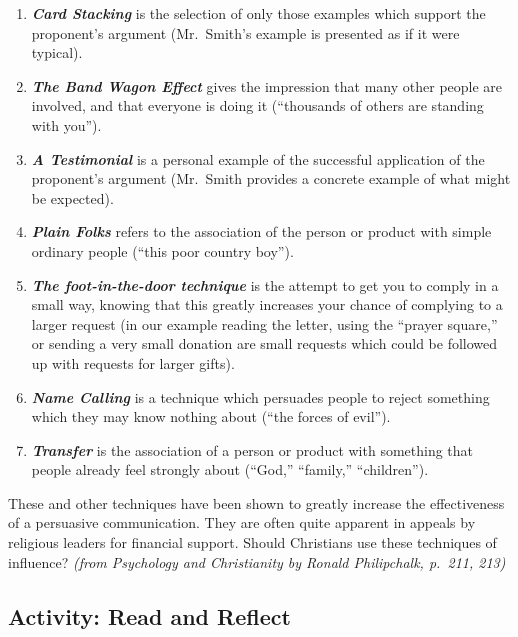 \documentclass[
]{book}
\providecommand{\tightlist}{%
  \setlength{\itemsep}{0pt}\setlength{\parskip}{0pt}}
\begin{document}
\begin{enumerate}
\def\labelenumi{\arabic{enumi}.}
\tightlist
\item
  \textbf{\emph{Card Stacking}} is the selection of only those examples which support the proponent's argument (Mr.~Smith's example is presented as if it were typical).\\
\item
  \textbf{\emph{The Band Wagon Effect}} gives the impression that many other people are involved, and that everyone is doing it (``thousands of others are standing with you'').\\
\item
  \textbf{\emph{A Testimonial}} is a personal example of the successful application of the proponent's argument (Mr.~Smith provides a concrete example of what might be expected).\\
\item
  \textbf{\emph{Plain Folks}} refers to the association of the person or product with simple ordinary people (``this poor country boy'').\\
\item
  \textbf{\emph{The foot-in-the-door technique}} is the attempt to get you to comply in a small way, knowing that this greatly increases your chance of complying to a larger request (in our example reading the letter, using the ``prayer square,'' or sending a very small donation are small requests which could be followed up with requests for larger gifts).\\
\item
  \textbf{\emph{Name Calling}} is a technique which persuades people to reject something which they may know nothing about (``the forces of evil'').\\
\item
  \textbf{\emph{Transfer}} is the association of a person or product with something that people already feel strongly about (``God,'' ``family,'' ``children'').
\end{enumerate}

These and other techniques have been shown to greatly increase the effectiveness of a persuasive communication. They are often quite apparent in appeals by religious leaders for financial support. Should Christians use these techniques of influence? \emph{(from Psychology and Christianity by Ronald Philipchalk, p.~211, 213)}

\hypertarget{activity-read-and-reflect-8}{%
\subsection*{Activity: Read and Reflect}\label{activity-read-and-reflect-8}}
\end{document}
